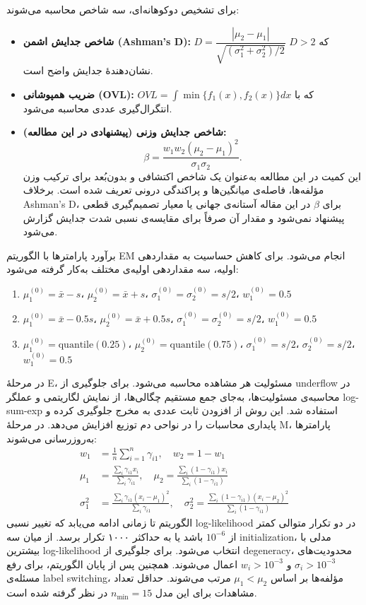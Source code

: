 \documentclass[12pt,a4paper,twocolumn]{article}
\begin{document}
برای تشخیص دوکوهانه‌ای، سه شاخص محاسبه می‌شوند:
\begin{itemize}
\item \textbf{شاخص جدایش اشمن (Ashman's D):} $D = \dfrac{|\mu_{2} - \mu_{1}|}{\sqrt{(\sigma_{1}^{2} + \sigma_{2}^{2})/2}}$ که $D>2$ نشان‌دهندهٔ جدایش واضح است.
\item \textbf{ضریب همپوشانی (OVL):} $OVL = \int \min\{f_{1}(x),f_{2}(x)\} dx$ که با انتگرال‌گیری عددی محاسبه می‌شود.
\item \textbf{شاخص جدایش وزنی (پیشنهادی در این مطالعه):}
\[
\beta = \dfrac{w_{1}w_{2}(\mu_{2} - \mu_{1})^{2}}{\sigma_{1}\sigma_{2}}.
\]
این کمیت در این مطالعه به‌عنوان یک شاخص اکتشافی و بدون‌بُعد برای ترکیب وزن مؤلفه‌ها، فاصله‌ی میانگین‌ها و پراکندگی درونی تعریف شده است. برخلاف Ashman's D، برای $\beta$ در این مقاله آستانه‌ی جهانی یا معیار تصمیم‌گیری قطعی پیشنهاد نمی‌شود و مقدار آن صرفاً برای مقایسه‌ی نسبی شدت جدایش گزارش می‌شود.
\end{itemize}

برآورد پارامترها با الگوریتم EM انجام می‌شود. برای کاهش حساسیت به مقداردهی اولیه، سه مقداردهی اولیه‌ی مختلف به‌کار گرفته می‌شود:
\begin{enumerate}
\item $\mu_1^{(0)} = \bar{x} - s$، $\mu_2^{(0)} = \bar{x} + s$، $\sigma_1^{(0)} = \sigma_2^{(0)} = s/2$، $w_1^{(0)}=0.5$
\item $\mu_1^{(0)} = \bar{x} - 0.5s$، $\mu_2^{(0)} = \bar{x} + 0.5s$، $\sigma_1^{(0)} = \sigma_2^{(0)} = s/2$، $w_1^{(0)}=0.5$
\item $\mu_1^{(0)} = \text{quantile}(0.25)$، $\mu_2^{(0)} = \text{quantile}(0.75)$، $\sigma_1^{(0)} = s/2$، $\sigma_2^{(0)} = s/2$، $w_1^{(0)}=0.5$
\end{enumerate}
در مرحلهٔ E، مسئولیت هر مشاهده محاسبه می‌شود. برای جلوگیری از underflow در محاسبه‌ی مسئولیت‌ها، به‌جای جمع مستقیم چگالی‌ها، از نمایش لگاریتمی و عملگر log-sum-exp استفاده شد. این روش از افزودن ثابت عددی به مخرج جلوگیری کرده و پایداری محاسبات را در نواحی دم توزیع افزایش می‌دهد. در مرحلهٔ M، پارامترها به‌روزرسانی می‌شوند:
\begin{align}
w_1 &= \frac{1}{n}\sum_{i=1}^{n} \gamma_{i1}, \quad w_2 = 1-w_1 \\
\mu_1 &= \frac{\sum_i \gamma_{i1} x_i}{\sum_i \gamma_{i1}}, \quad
\mu_2 = \frac{\sum_i (1-\gamma_{i1}) x_i}{\sum_i (1-\gamma_{i1})} \\
\sigma_1^2 &= \frac{\sum_i \gamma_{i1} (x_i-\mu_1)^2}{\sum_i \gamma_{i1}}, \quad
\sigma_2^2 = \frac{\sum_i (1-\gamma_{i1}) (x_i-\mu_2)^2}{\sum_i (1-\gamma_{i1})}
\end{align}
الگوریتم تا زمانی ادامه می‌یابد که تغییر نسبی log-likelihood در دو تکرار متوالی کمتر از $10^{-6}$ باشد یا به حداکثر ۱۰۰۰ تکرار برسد. از میان سه initialization، مدلی با بیشترین log-likelihood انتخاب می‌شود. برای جلوگیری از degeneracy، محدودیت‌های $\sigma_i > 10^{-3}$ و $w_i > 10^{-3}$ اعمال می‌شوند. همچنین پس از پایان الگوریتم، برای رفع مسئله‌ی label switching، مؤلفه‌ها بر اساس $\mu_1 < \mu_2$ مرتب می‌شوند. حداقل تعداد مشاهدات برای این مدل $n_{\min}=15$ در نظر گرفته شده است.
\end{document}
